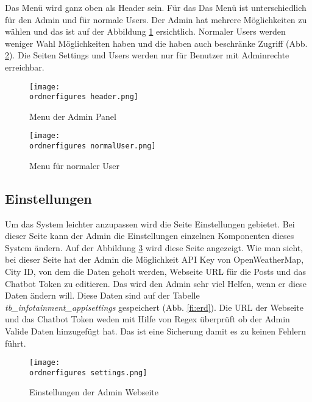 Das Menü wird ganz oben als Header sein. Für das Das Menü ist unterschiedlich für den Admin und für normale Users. Der Admin hat mehrere Möglichkeiten zu wählen und das ist auf der Abbildung \ref{fi:menu} ersichtlich. Normaler Users werden weniger Wahl Möglichkeiten haben und die haben auch beschränke Zugriff (Abb. \ref{fi:normalerUser}). Die Seiten Settings und Users werden nur für Benutzer mit Adminrechte erreichbar.

\begin{figure}[H]
	\centering
	\texttt{[image: \\ordnerfigures header.png]}
	\caption{Menu der Admin Panel}
	\label{fi:menu}
\end{figure}

\begin{figure}[H]
	\centering
	\texttt{[image: \\ordnerfigures normalUser.png]}
	\caption{Menu für normaler User}
	\label{fi:normalerUser}
\end{figure}




\subsection{Einstellungen}
Um das System leichter anzupassen wird die Seite Einstellungen gebietet. Bei dieser Seite kann der Admin die Einstellungen einzelnen Komponenten dieses System ändern. Auf der Abbildung \ref{fi:settings} wird diese Seite angezeigt. Wie man sieht, bei dieser Seite hat der Admin die Möglichkeit API Key von OpenWeatherMap, City ID, von dem die Daten geholt werden, Webseite URL für die Posts und das Chatbot Token zu editieren. Das wird den Admin sehr viel Helfen, wenn er diese Daten ändern will. Diese Daten sind auf der Tabelle \textit{tb\_infotainment\_appisettings} gespeichert (Abb. \ref{fi:erd}). Die URL der Webseite und das Chatbot Token weden mit Hilfe von Regex überprüft ob der Admin Valide Daten hinzugefügt hat. Das ist eine Sicherung damit es zu keinen Fehlern führt.

\begin{figure}[H]
	\centering
	\texttt{[image: \\ordnerfigures settings.png]}
	\caption{Einstellungen der Admin Webseite}
	\label{fi:settings}
\end{figure}


